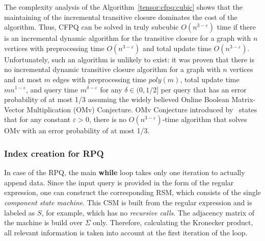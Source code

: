 The complexity analysis of the Algorithm~\ref{tensor:cfpq:cubic} shows that the maintaining of the incremental transitive closure dominates the cost of the algorithm. Thus, CFPQ can be solved in truly subcubic $O(n^{3-\varepsilon})$ time if there is an incremental dynamic algorithm for the transitive closure for a graph with $n$ vertices with preprocessing time $O(n^{3-\varepsilon})$ and total update time $O(n^{3-\varepsilon})$. Unfortunately, such an algorithm is unlikely to exist: it was proven that there is no incremental dynamic transitive closure algorithm for a graph with $n$ vertices and at most $m$ edges with preprocessing time $poly(m)$, total update time $mn^{1-\varepsilon}$, and query time $m^{\delta-\varepsilon}$ for any $\delta \in (0, 1/2]$ per query that has an error probability of at most 1/3 assuming the widely believed Online Boolean Matrix-Vector Multiplication (OMv) Conjecture. OMv Conjecture introduced by~\cite{10.1145/2746539.2746609} states that for any constant $ \varepsilon>0$, there is no $O(n^{3-\varepsilon})$-time algorithm that solves OMv with an error probability of at most 1/3. 



\subsubsection{Index creation for RPQ}
In case of the RPQ, the main \textbf{while} loop takes only one iteration to actually append data.
Since the input query is provided in the form of the regular expression, one can construct the corresponding RSM, which consists of the single \textit{component state machine}.
This CSM is built from the regular expression and is labeled as $S$, for example, which has no \textit{recursive calls}.
The adjacency matrix of the machine is build over $\Sigma$ only.
Therefore, calculating the Kronecker product, all relevant information is taken into account at the first iteration of the loop.